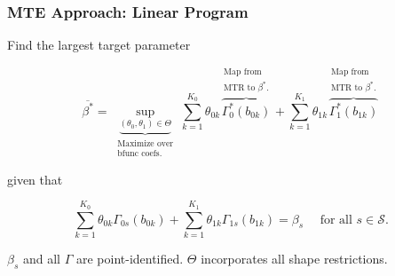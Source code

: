 \documentclass[11pt, aspectratio=169]{beamer}
\newcommand{\indep}{\perp\!\!\!\!\perp}
\begin{document}




\begin{frame}
    \frametitle{MTE Approach: Linear Program}

    Find the largest target parameter


    \begin{equation*}
        \overline{\beta^*} = \underbrace{\sup_{(\theta_0, \theta_1) \in \Theta}}_{\substack{\text{Maximize over} \\ \text{bfunc coefs.}}}\sum_{k=1}^{K_0} \theta_{0k}\overbrace{\Gamma^*_0(b_{0k})}^{\substack{\text{Map from} \\ \text{MTR to } \beta^*.}} + \sum_{k=1}^{K_1} \theta_{1k}\overbrace{\Gamma^*_1(b_{1k})}^{\substack{\text{Map from} \\ \text{MTR to } \beta^*.}}
    \end{equation*}

    \pause

    given that

    \begin{equation*}
        \sum_{k=1}^{K_0} \theta_{0k}\Gamma_{0s}(b_{0k}) + \sum_{k=1}^{K_1} \theta_{1k} \Gamma_{1s}(b_{1k}) = \beta_s \quad \text{ for all } s\in\mathcal{S}.
    \end{equation*}

    \vspace{0.5cm}
    $\beta_s$ and all $\Gamma$ are point-identified.
    $\Theta$ incorporates all shape restrictions.

\end{frame}
\end{document}
